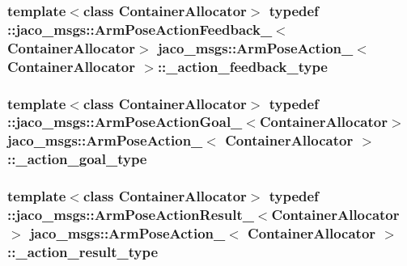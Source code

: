 \subsubsection[{\texorpdfstring{\+\_\+action\+\_\+feedback\+\_\+type}{_action_feedback_type}}]{\setlength{\rightskip}{0pt plus 5cm}template$<$class Container\+Allocator$>$ typedef \+::{\bf jaco\+\_\+msgs\+::\+Arm\+Pose\+Action\+Feedback\+\_\+}$<$Container\+Allocator$>$ {\bf jaco\+\_\+msgs\+::\+Arm\+Pose\+Action\+\_\+}$<$ Container\+Allocator $>$\+::{\bf \+\_\+action\+\_\+feedback\+\_\+type}}\hypertarget{structjaco__msgs_1_1ArmPoseAction___ab82fcbe56cd092eae3d3f785366c3dc5}{}\label{structjaco__msgs_1_1ArmPoseAction___ab82fcbe56cd092eae3d3f785366c3dc5}
\subsubsection[{\texorpdfstring{\+\_\+action\+\_\+goal\+\_\+type}{_action_goal_type}}]{\setlength{\rightskip}{0pt plus 5cm}template$<$class Container\+Allocator$>$ typedef \+::{\bf jaco\+\_\+msgs\+::\+Arm\+Pose\+Action\+Goal\+\_\+}$<$Container\+Allocator$>$ {\bf jaco\+\_\+msgs\+::\+Arm\+Pose\+Action\+\_\+}$<$ Container\+Allocator $>$\+::{\bf \+\_\+action\+\_\+goal\+\_\+type}}\hypertarget{structjaco__msgs_1_1ArmPoseAction___aa0a5074c68ff609cd35a2e7895dfadf2}{}\label{structjaco__msgs_1_1ArmPoseAction___aa0a5074c68ff609cd35a2e7895dfadf2}
\subsubsection[{\texorpdfstring{\+\_\+action\+\_\+result\+\_\+type}{_action_result_type}}]{\setlength{\rightskip}{0pt plus 5cm}template$<$class Container\+Allocator$>$ typedef \+::{\bf jaco\+\_\+msgs\+::\+Arm\+Pose\+Action\+Result\+\_\+}$<$Container\+Allocator$>$ {\bf jaco\+\_\+msgs\+::\+Arm\+Pose\+Action\+\_\+}$<$ Container\+Allocator $>$\+::{\bf \+\_\+action\+\_\+result\+\_\+type}}\hypertarget{structjaco__msgs_1_1ArmPoseAction___a212752482103a559acb2077bf8d90d71}{}\label{structjaco__msgs_1_1ArmPoseAction___a212752482103a559acb2077bf8d90d71}
